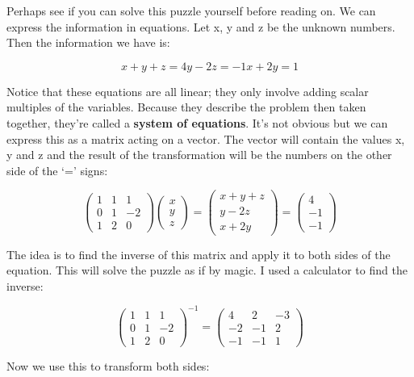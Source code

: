 \documentclass[oneside,english]{amsbook}
\numberwithin{section}{chapter}
\theoremstyle{plain}
\theoremstyle{definition}
\begin{document}
Perhaps see if you can solve this puzzle yourself before reading on. We
can express the information in equations. Let x, y and z be the unknown
numbers. Then the information we have is:

\[{x + y + z = 4
}{y - 2z = - 1
}{x + 2y = 1}\]

Notice that these equations are all linear; they only involve adding
scalar multiples of the variables. Because they describe the problem
then taken together, they're called a \textbf{system of equations}. It's
not obvious but we can express this as a matrix acting on a vector. The
vector will contain the values x, y and z and the result of the
transformation will be the numbers on the other side of the `=' signs:

\[\begin{pmatrix}
	1 & 1 & 1 \\
	0 & 1 & - 2 \\
	1 & 2 & 0
\end{pmatrix}\begin{pmatrix}
	x \\
	y \\
	z
\end{pmatrix} = \begin{pmatrix}
	x + y + z \\
	y - 2z \\
	x + 2y
\end{pmatrix} = \begin{pmatrix}
	4 \\
	- 1 \\
	- 1
\end{pmatrix}\]

The idea is to find the inverse of this matrix and apply it to both
sides of the equation. This will solve the puzzle as if by magic. I used
a calculator to find the inverse:

\[\begin{pmatrix}
	1 & 1 & 1 \\
	0 & 1 & - 2 \\
	1 & 2 & 0
\end{pmatrix}^{- 1} = \begin{pmatrix}
	4 & 2 & - 3 \\
	- 2 & - 1 & 2 \\
	- 1 & - 1 & 1
\end{pmatrix}\]

Now we use this to transform both sides:
\end{document}
